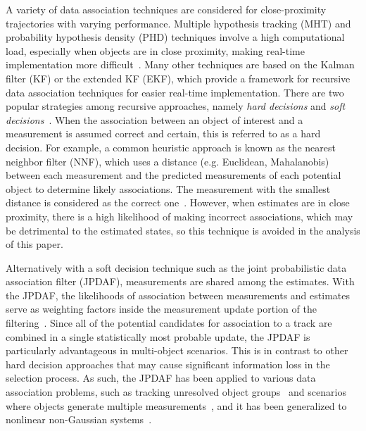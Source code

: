 A variety of data association techniques are considered for close-proximity trajectories with varying performance.
Multiple hypothesis tracking (MHT) and probability hypothesis density (PHD) techniques involve a high computational load, especially when objects are in close proximity, making real-time implementation more difficult~\cite{MHT1,PHD1,PHD2}.
Many other techniques are based on the Kalman filter (KF) or the extended KF (EKF), which provide a framework for recursive data association techniques for easier real-time implementation.
There are two popular strategies among recursive approaches, namely \emph{hard decisions} and \emph{soft decisions}~\cite{JPDAF1}.
When the association between an object of interest and a measurement is assumed correct and certain, this is referred to as a hard decision.
For example, a common heuristic approach is known as the nearest neighbor filter (NNF), which uses a distance (e.g. Euclidean, Mahalanobis) between each measurement and the predicted measurements of each potential object to determine likely associations.
The measurement with the smallest distance is considered as the correct one~\cite{NN2}.
However, when estimates are in close proximity, there is a high likelihood of making incorrect associations, which may be detrimental to the estimated states, so this technique is avoided in the analysis of this paper.

Alternatively with a soft decision technique such as the joint probabilistic data association filter (JPDAF), measurements are shared among the estimates. With the JPDAF, the likelihoods of association between measurements and estimates serve as weighting factors inside the measurement update portion of the filtering~\cite{JPDAF1,TrackDataAssoc}.
Since all of the potential candidates for association to a track are combined in a single statistically most probable update, the JPDAF is particularly advantageous in multi-object scenarios.
This is in contrast to other hard decision approaches that may cause significant information loss in the selection process.
As such, the JPDAF has been applied to various data association problems, such as tracking unresolved object groups~\cite{SveUlmDan10} and scenarios where objects generate multiple measurements~\cite{HabThaThaMalKir13}, and it has been generalized to nonlinear non-Gaussian systems~\cite{WeiJinYou05}.

